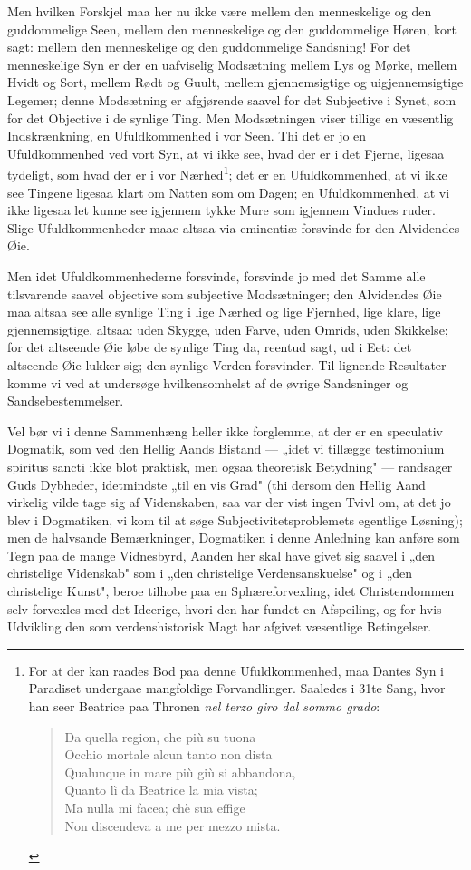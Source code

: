 \documentclass[12pt]{book}
\newcommand{\opage}[1]{\marginnote{\footnotesize\textit{[#1]}}}
\begin{document}
Men hvilken Forskjel maa her nu ikke være mellem den menneskelige og den
guddommelige Seen, mellem den menneskelige og den guddommelige Høren, kort sagt:
mellem den menneskelige og den guddommelige Sandsning! For det menneskelige Syn
er der en uafviselig Modsætning mellem Lys og Mørke, mellem Hvidt og Sort, mellem
Rødt og Guult, mellem gjennemsigtige og uigjennemsigtige Legemer; denne
Modsætning er afgjørende saavel for det Subjective i Synet, som for det Objective
i de synlige Ting. Men Modsætningen viser tillige en væsentlig Indskrænkning, en
Ufuldkommenhed i vor Seen. Thi det er jo en Ufuldkommenhed ved vort Syn, at vi
ikke see, hvad der er i det Fjerne, ligesaa tydeligt, som hvad der er i vor
Nærhed\footnote{For at der kan raades Bod paa denne Ufuldkommenhed, maa Dantes
Syn i Paradiset undergaae mangfoldige Forvandlinger. Saaledes i 31te Sang, hvor
han seer Beatrice paa Thronen \emph{nel terzo giro dal sommo grado}:
\begin{verse}
Da quella region, che più su tuona\\
Occhio mortale alcun tanto non dista\\
Qualunque in mare più giù si abbandona,\\
Quanto lì da Beatrice la mia vista;\\
Ma nulla mi facea; chè sua effige\\
Non discendeva a me per mezzo mista.
\end{verse}}; det er en Ufuldkommenhed, at vi ikke see Tingene ligesaa klart om
Natten som om Dagen; en Ufuldkommenhed, at vi ikke ligesaa let kunne see igjennem
tykke Mure som igjennem Vindues%
\opage{46} ruder. Slige Ufuldkommenheder maae altsaa via eminentiæ forsvinde for den
Alvidendes Øie.

Men idet Ufuldkommenhederne forsvinde, forsvinde jo med det Samme alle
tilsvarende saavel objective som subjective Modsætninger; den Alvidendes Øie maa
altsaa see alle synlige Ting i lige Nærhed og lige Fjernhed, lige klare, lige
gjennemsigtige, altsaa: uden Skygge, uden Farve, uden Omrids, uden Skikkelse; for
det altseende Øie løbe de synlige Ting da, reentud sagt, ud i Eet: det altseende
Øie lukker sig; den synlige Verden forsvinder. Til lignende Resultater komme vi
ved at undersøge hvilkensomhelst af de øvrige Sandsninger og Sandsebestemmelser.

Vel bør vi i denne Sammenhæng heller ikke forglemme, at der er en speculativ
Dogmatik, som ved den Hellig Aands Bistand --- „idet vi tillægge testimonium
spiritus sancti ikke blot praktisk, men ogsaa theoretisk Betydning" --- randsager
Guds Dybheder, idetmindste „til en vis Grad" (thi dersom den Hellig Aand virkelig
vilde tage sig af Videnskaben, saa var der vist ingen Tvivl om, at det jo blev i
Dogmatiken, vi kom til at søge Subjectivitetsproblemets egentlige Løsning); men de
halvsande Bemærkninger, Dogmatiken i denne Anledning kan anføre som Tegn paa de
mange Vidnesbyrd, Aanden her skal have givet sig saavel i „den christelige
Videnskab" som i „den christelige Verdensanskuelse" og i „den christelige Kunst",
beroe tilhobe paa en Sphæreforvexling, idet Christendommen selv forvexles med det
Ideerige, hvori den har fundet en Afspeiling, og for hvis Udvikling den som
verdenshistorisk Magt har afgivet væsentlige Betingelser.
\end{document}
